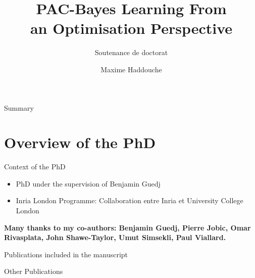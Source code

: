 \documentclass{presentation}
\title{PAC-Bayes Learning From\\ an Optimisation Perspective}
\subtitle{Soutenance de doctorat}
\author{\vspace{-1.5cm}
 Maxime Haddouche}
\institute{
\vspace{1.8cm}
Inria London\\
Université de Lille\\
}
\date{\vspace{0.5cm}

{\bf Mercredi 2 Octobre 2024}}
\begin{document}
\begin{xframe}{}
    \maketitle
\end{xframe}


\begin{xframe}{Summary}
    \tableofcontents
\end{xframe}

\section{Overview of the PhD}

    \begin{xframe}{Context of the PhD}
        \vspace{1cm}
        \begin{itemize}
            \item PhD under the supervision of Benjamin Guedj
            \item Inria London Programme: Collaboration entre Inria et University College London
        \end{itemize}
    \vspace{0.5cm}
        \begin{blackblock}{}
            {\bf \Large Many thanks to my co-authors: Benjamin Guedj, Pierre Jobic, Omar Rivasplata, John Shawe-Taylor, Umut Simsekli, Paul Viallard.}
        \end{blackblock}
    \end{xframe}

    \begin{frame}[allowframebreaks]{Publications included in the manuscript}
        \begin{refsection}
            \nocite{*}
            \printbibliography[heading={subbibliography}, keyword={conference}, title={Conference article}]
            \printbibliography[heading={subbibliography}, keyword={journal}, title={Journal article}]
            \printbibliography[heading={subbibliography}, keyword={report}, title={Research Report}]
            \end{refsection}
    \end{frame}

    \begin{frame}[allowframebreaks]{Other Publications}
        \begin{refsection}
            \nocite{*}
            \printbibliography[heading={subbibliography}, keyword={conference}, title={Conference article}]
            \printbibliography[heading={subbibliography}, keyword={journal}, title={Journal article}]
            \printbibliography[heading={subbibliography}, keyword={report}, title={Research Report}]
            \end{refsection}
    \end{frame}
\end{document}
